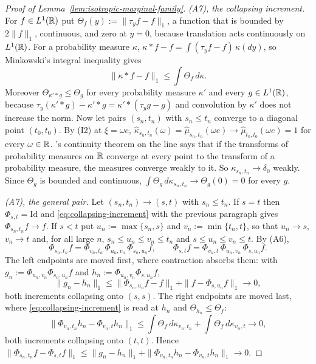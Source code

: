 \begin{proof}[Proof of Lemma~\ref{lem:isotropic-marginal-family}]
\emph{(A7), the collapsing increment.} For $f \in L^1(\mathbb{R})$ put
$\Theta_f(y) := \|\tau_yf - f\|_1$, a function that is bounded by $2\|f\|_1$, continuous, and zero
at $y = 0$, because translation acts continuously on $L^1(\mathbb{R})$. For a probability measure $\kappa$,
$\kappa * f - f = \int(\tau_yf - f)\,\kappa(dy)$, so Minkowski's integral inequality gives
\begin{equation}\label{eq:collapsing-increment}
  \|\kappa * f - f\|_1 \le \int \Theta_f\,d\kappa .
\end{equation}
Moreover $\Theta_{\kappa' * g} \le \Theta_g$ for every probability measure $\kappa'$ and every
$g \in L^1(\mathbb{R})$, because $\tau_y(\kappa' * g) - \kappa' * g = \kappa' * (\tau_yg - g)$ and
convolution by $\kappa'$ does not increase the norm. Now let pairs $(s_n,t_n)$ with
$s_n \le t_n$ converge to a diagonal point $(t_0,t_0)$. By (I2) at $\xi = \omega e$,
$\widehat\kappa_{s_n,t_n}(\omega) = \widehat\mu_{s_n,t_n}(\omega e) \to \widehat\mu_{t_0,t_0}(\omega e) = 1$
for every $\omega \in \mathbb{R}$. \Levy's continuity theorem on the line  says that if
the transforms of probability measures on $\mathbb{R}$ converge at every point to the transform of a
probability measure, the measures converge weakly to it. So $\kappa_{s_n,t_n} \to \delta_0$
weakly. Since $\Theta_g$ is bounded and continuous, $\int\Theta_g\,d\kappa_{s_n,t_n} \to
\Theta_g(0) = 0$ for every $g$.

\emph{(A7), the general pair.} Let $(s_n,t_n) \to (s,t)$ with $s_n \le t_n$. If $s = t$ then
$\Phi_{s,t} = \mathrm{Id}$ and \ref{eq:collapsing-increment} with the previous paragraph gives
$\Phi_{s_n,t_n}f \to f$. If $s < t$ put $u_n := \max\{s_n,s\}$ and $v_n := \min\{t_n,t\}$, so
that $u_n \to s$, $v_n \to t$ and, for all large $n$, $s_n \le u_n \le v_n \le t_n$ and
$s \le u_n \le v_n \le t$. By (A6),
\[
  \Phi_{s_n,t_n}f = \Phi_{v_n,t_n}\,\Phi_{u_n,v_n}\,\Phi_{s_n,u_n}f ,
  \qquad
  \Phi_{s,t}f = \Phi_{v_n,t}\,\Phi_{u_n,v_n}\,\Phi_{s,u_n}f .
\]
The left endpoints are moved first, where contraction absorbs them: with
$g_n := \Phi_{u_n,v_n}\Phi_{s_n,u_n}f$ and $h_n := \Phi_{u_n,v_n}\Phi_{s,u_n}f$,
\[
  \|g_n - h_n\|_1 \le \|\Phi_{s_n,u_n}f - f\|_1 + \|f - \Phi_{s,u_n}f\|_1 \to 0 ,
\]
both increments collapsing onto $(s,s)$. The right endpoints are moved last, where
\ref{eq:collapsing-increment} is read at $h_n$ and $\Theta_{h_n} \le \Theta_f$:
\[
  \|\Phi_{v_n,t_n}h_n - \Phi_{v_n,t}h_n\|_1
   \le \int\Theta_f\,d\kappa_{v_n,t_n} + \int\Theta_f\,d\kappa_{v_n,t} \to 0 ,
\]
both increments collapsing onto $(t,t)$. Hence
$\|\Phi_{s_n,t_n}f - \Phi_{s,t}f\|_1 \le \|g_n - h_n\|_1
+ \|\Phi_{v_n,t_n}h_n - \Phi_{v_n,t}h_n\|_1 \to 0$.
\end{proof}

